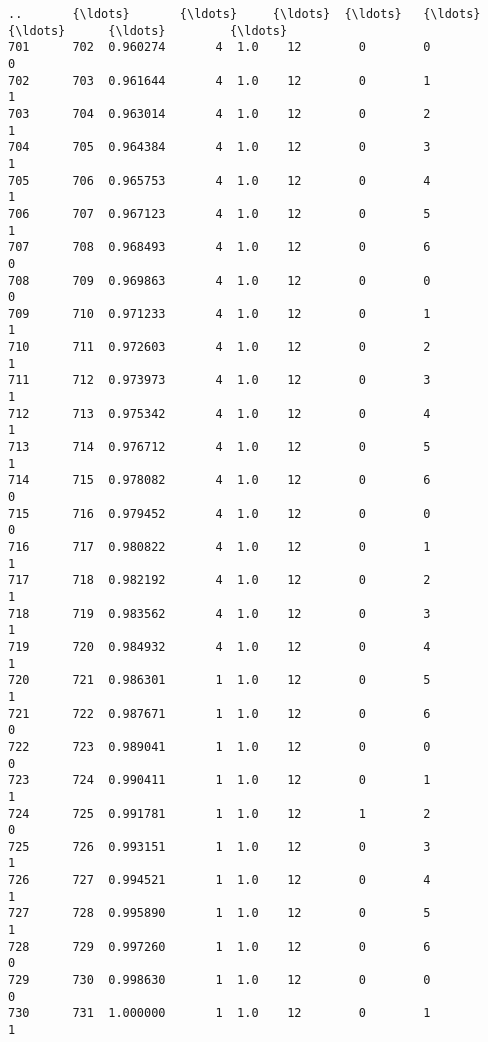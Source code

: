 \documentclass[11pt]{article}
\begin{document}
\begin{Verbatim}[commandchars=\\\{\}]
..       {\ldots}       {\ldots}     {\ldots}  {\ldots}   {\ldots}      {\ldots}      {\ldots}         {\ldots}   
701      702  0.960274       4  1.0    12        0        0           0   
702      703  0.961644       4  1.0    12        0        1           1   
703      704  0.963014       4  1.0    12        0        2           1   
704      705  0.964384       4  1.0    12        0        3           1   
705      706  0.965753       4  1.0    12        0        4           1   
706      707  0.967123       4  1.0    12        0        5           1   
707      708  0.968493       4  1.0    12        0        6           0   
708      709  0.969863       4  1.0    12        0        0           0   
709      710  0.971233       4  1.0    12        0        1           1   
710      711  0.972603       4  1.0    12        0        2           1   
711      712  0.973973       4  1.0    12        0        3           1   
712      713  0.975342       4  1.0    12        0        4           1   
713      714  0.976712       4  1.0    12        0        5           1   
714      715  0.978082       4  1.0    12        0        6           0   
715      716  0.979452       4  1.0    12        0        0           0   
716      717  0.980822       4  1.0    12        0        1           1   
717      718  0.982192       4  1.0    12        0        2           1   
718      719  0.983562       4  1.0    12        0        3           1   
719      720  0.984932       4  1.0    12        0        4           1   
720      721  0.986301       1  1.0    12        0        5           1   
721      722  0.987671       1  1.0    12        0        6           0   
722      723  0.989041       1  1.0    12        0        0           0   
723      724  0.990411       1  1.0    12        0        1           1   
724      725  0.991781       1  1.0    12        1        2           0   
725      726  0.993151       1  1.0    12        0        3           1   
726      727  0.994521       1  1.0    12        0        4           1   
727      728  0.995890       1  1.0    12        0        5           1   
728      729  0.997260       1  1.0    12        0        6           0   
729      730  0.998630       1  1.0    12        0        0           0   
730      731  1.000000       1  1.0    12        0        1           1   


\end{Verbatim}
\end{document}

